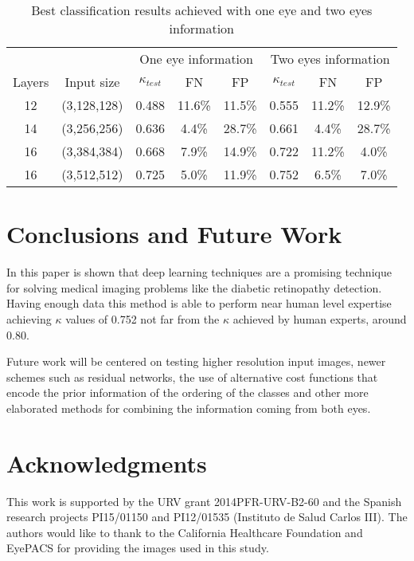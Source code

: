 \documentclass{IOS-Book-Article}
\begin{document}
\begin{table}[ht!]
	\centering
	\begin{tabular}{*8c} 
		\hline
		       &            & \multicolumn{3}{c}{One eye information} & \multicolumn{3}{c}{Two eyes information} \\
		Layers & Input size & $\kappa_{test}$ & FN & FP & $\kappa_{test}$ & FN & FP \\ [0.5ex] 
		\hline\hline
		12 & (3,128,128) & 0.488 & 11.6\%& 11.5\% & 0.555 & 11.2\%& 12.9\%\\ 
		14 & (3,256,256) & 0.636 & 4.4\%& 28.7\% & 0.661 & 4.4\% & 28.7\% \\ 
		16 & (3,384,384) & 0.668 & 7.9\%& 14.9\% & 0.722 & 11.2\% & 4.0\%  \\ 
		16 & (3,512,512) & 0.725 & 5.0\%& 11.9\% & 0.752 & 6.5\% & 7.0\% \\ 
		\hline
	\end{tabular}
	\caption{Best classification results achieved with one eye and two eyes information}
	\label{table-results}
\end{table}

\section{Conclusions and Future Work}
In this paper is shown that deep learning techniques are a promising technique for solving medical imaging problems like the diabetic retinopathy detection. Having enough data this method is able to perform near human level expertise achieving $\kappa$ values of 0.752 not far from the $\kappa$ achieved by human experts, around 0.80. 

Future work will be centered on testing higher resolution input images, newer schemes such as residual networks, the use of alternative cost functions that encode the prior information of the ordering of the classes and other more elaborated methods for combining the information coming from both eyes.

\section*{Acknowledgments}
{\tiny This work is supported by the URV grant 2014PFR-URV-B2-60 and the Spanish research projects PI15/01150 and PI12/01535 (Instituto de Salud Carlos III). The authors would like to thank to the California Healthcare Foundation and EyePACS for providing the images used in this study.}



\end{document}

